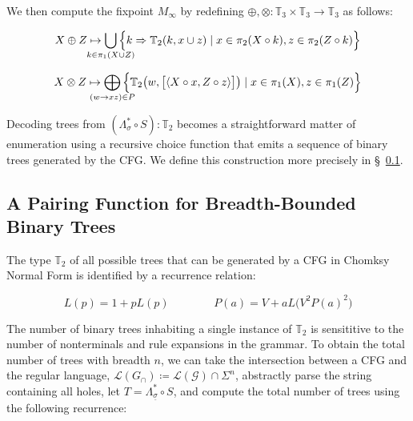 \documentclass[sigplan,review,anonymous,acmsmall]{acmart}\settopmatter{printfolios=false,printccs=false,printacmref=false}
\begin{document}
  \noindent We then compute the fixpoint $M_\infty$ by redefining $\oplus, \otimes: \mathbb{T}_3 \times \mathbb{T}_3 \rightarrow \mathbb{T}_3$ as follows:

  \begin{equation}
    X \oplus Z \mapsto \bigcup_{\mathclap{k\in \pi_1(X \cup Z)}}\Big\{k \Rightarrow \mathbb{T}_2(k, x \cup z) \mid x \in \pi_2(X\circ k), z \in \pi_2(Z\circ k)\Big\}
  \end{equation}

  \begin{equation}
    X \otimes Z \mapsto \bigoplus_{\mathclap{(w\rightarrow xz) \in P}}\Big\{\mathbb{T}_2\big(w, \big[\langle X\circ x, Z\circ z\rangle\big]\big) \mid x \in \pi_1(X), z \in \pi_1(Z)\Big\}
  \end{equation}

  Decoding trees from $(\Lambda_\sigma^* \circ S): \mathbb{T}_2$ becomes a straightforward matter of enumeration using a recursive choice function that emits a sequence of binary trees generated by the CFG. We define this construction more precisely in \S~\ref{sec:pairing}.


  \subsection{A Pairing Function for Breadth-Bounded Binary Trees}\label{sec:pairing}

  The type $\mathbb{T}_2$ of all possible trees that can be generated by a CFG in Chomksy Normal Form is identified by a recurrence relation:

  \begin{equation}
    L(p) = 1 + p L(p) \phantom{addspace} P(a) = V + a L\big(V^2P(a)^2\big)
  \end{equation}

  The number of binary trees inhabiting a single instance of $\mathbb{T}_2$ is sensititive to the number of nonterminals and rule expansions in the grammar. To obtain the total number of trees with breadth $n$, we can take the intersection between a CFG and the regular language, $\mathcal{L}(G_\cap) \coloneqq \mathcal{L}(\mathcal{G}) \cap \Sigma^n$, abstractly parse the string containing all holes, let $T=\Lambda_{\underline\sigma}^* \circ S$, and compute the total number of trees using the following recurrence:
\end{document}
